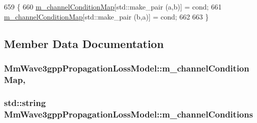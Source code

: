 \begin{DoxyCode}
659 \{
660         \hyperlink{classMmWave3gppPropagationLossModel_a47c60c0cfcc0545dd3039393d21de5ac}{m\_channelConditionMap}[std::make\_pair (a,b)] = cond;
661         \hyperlink{classMmWave3gppPropagationLossModel_a47c60c0cfcc0545dd3039393d21de5ac}{m\_channelConditionMap}[std::make\_pair (b,a)] = cond;
662 
663 \}
\end{DoxyCode}


\subsection{Member Data Documentation}
\subsubsection[{\texorpdfstring{m\+\_\+channel\+Condition\+Map}{m_channelConditionMap}}]{ Mm\+Wave3gpp\+Propagation\+Loss\+Model\+::m\+\_\+channel\+Condition\+Map\hspace{0.3cm}{\ttfamily [mutable]}, {\ttfamily [private]}}\hypertarget{classMmWave3gppPropagationLossModel_a47c60c0cfcc0545dd3039393d21de5ac}{}\label{classMmWave3gppPropagationLossModel_a47c60c0cfcc0545dd3039393d21de5ac}
\subsubsection[{\texorpdfstring{m\+\_\+channel\+Conditions}{m_channelConditions}}]{\setlength{\rightskip}{0pt plus 5cm}std\+::string Mm\+Wave3gpp\+Propagation\+Loss\+Model\+::m\+\_\+channel\+Conditions\hspace{0.3cm}{\ttfamily [private]}}\hypertarget{classMmWave3gppPropagationLossModel_a416f5b42f67f2d950344b4746885230d}{}\label{classMmWave3gppPropagationLossModel_a416f5b42f67f2d950344b4746885230d}
